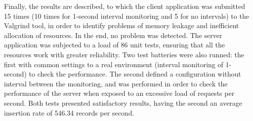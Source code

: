 Finally, the results are described, to which the client application was submitted 15 times (10 times for 1-second interval monitoring and 5 for no intervals) to the Valgrind tool, in order to identify problems of memory leakage and inefficient allocation of resources. In the end, no problem was detected. The server application was subjected to a load of 86 unit tests, ensuring that all the resources work with greater reliability. Two test batteries were also runned: the first with common settings to a real environment (interval monitoring of 1-second) to check the performance. The second defined a configuration without interval between the monitoring, and was performed in order to check the performance of the server when exposed to an excessive load of requests per second. Both tests presented satisfactory results, having the second an average insertion rate of 546.34 records per second.